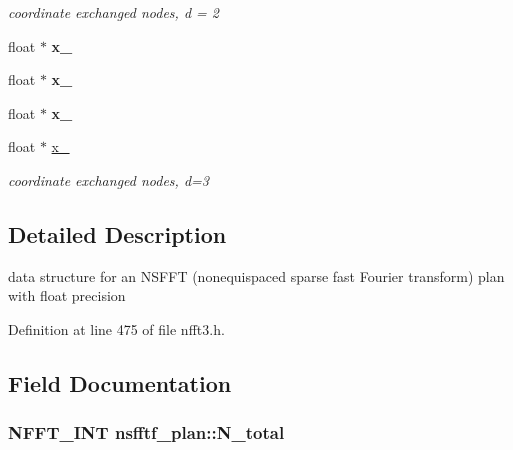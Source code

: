 \begin{DoxyCompactItemize}
\begin{DoxyCompactList}\small\item\em coordinate exchanged nodes, d = 2 \end{DoxyCompactList}\item 
\hypertarget{structnsfftf__plan_a75d9522d68301da2204ef8bad0e25262}{float $\ast$ {\bfseries x\-\_}}\label{structnsfftf__plan_a75d9522d68301da2204ef8bad0e25262}

\item 
\hypertarget{structnsfftf__plan_aa47dcf1f293427495c9dbfa3e9229bd9}{float $\ast$ {\bfseries x\-\_}}\label{structnsfftf__plan_aa47dcf1f293427495c9dbfa3e9229bd9}

\item 
\hypertarget{structnsfftf__plan_a0ec93a3c77d2d0c5a0facf9655504320}{float $\ast$ {\bfseries x\-\_}}\label{structnsfftf__plan_a0ec93a3c77d2d0c5a0facf9655504320}

\item 
\hypertarget{structnsfftf__plan_a0c015fd2deca4e70105f0c68a6a69586}{float $\ast$ \hyperlink{structnsfftf__plan_a0c015fd2deca4e70105f0c68a6a69586}{x\-\_}}\label{structnsfftf__plan_a0c015fd2deca4e70105f0c68a6a69586}

\begin{DoxyCompactList}\small\item\em coordinate exchanged nodes, d=3 \end{DoxyCompactList}\end{DoxyCompactItemize}


\subsection{Detailed Description}
data structure for an N\-S\-F\-F\-T (nonequispaced sparse fast Fourier transform) plan with float precision 

Definition at line 475 of file nfft3.\-h.



\subsection{Field Documentation}
\hypertarget{structnsfftf__plan_abd472c8f7183e1721b7d036176497347}{
\subsubsection[{N\-\_\-total}]{\setlength{\rightskip}{0pt plus 5cm}N\-F\-F\-T\-\_\-\-I\-N\-T nsfftf\-\_\-plan\-::\-N\-\_\-total}}\label{structnsfftf__plan_abd472c8f7183e1721b7d036176497347}


